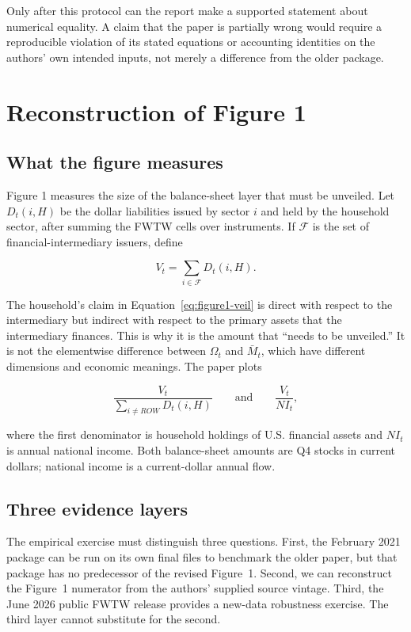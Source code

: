 \documentclass[11pt]{article}
\newcommand{\matM}{\bar M}
\begin{document}
Only after this protocol can the report make a supported statement about
numerical equality. A claim that the paper is partially wrong would require a
reproducible violation of its stated equations or accounting identities on the
authors' own intended inputs, not merely a difference from the older package.

\section{Reconstruction of Figure 1}
\label{sec:figure1}

\subsection{What the figure measures}

Figure 1 measures the size of the balance-sheet layer that must be unveiled.
Let $D_t(i,H)$ be the dollar liabilities issued by sector $i$ and held by the
household sector, after summing the FWTW cells over instruments. If
$\mathcal F$ is the set of financial-intermediary issuers, define

\begin{equation}
  V_t=\sum_{i\in\mathcal F}D_t(i,H).
  \label{eq:figure1-veil}
\end{equation}

The household's claim in Equation~\eqref{eq:figure1-veil} is direct with
respect to the intermediary but indirect with respect to the primary assets
that the intermediary finances. This is why it is the amount that ``needs to
be unveiled.'' It is not the elementwise difference between $\Omega_t$ and
$\matM_t$, which have different dimensions and economic meanings. The paper
plots

\begin{equation}
  \frac{V_t}{\sum_{i\ne ROW}D_t(i,H)}
  \qquad\text{and}\qquad
  \frac{V_t}{NI_t},
  \label{eq:figure1-series}
\end{equation}

where the first denominator is household holdings of U.S. financial assets
and $NI_t$ is annual national income. Both balance-sheet amounts are Q4 stocks
in current dollars; national income is a current-dollar annual flow.

\subsection{Three evidence layers}

The empirical exercise must distinguish three questions.  First, the
February 2021 package can be run on its own final files to benchmark the older
paper, but that package has no predecessor of the revised Figure~1.  Second,
we can reconstruct the Figure~1 numerator from the authors' supplied source
vintage.  Third, the June 2026 public FWTW release provides a new-data
robustness exercise.  The third layer cannot substitute for the second.
\end{document}
